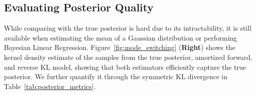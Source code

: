 

% 
% 
\vspace{-3mm}
\subsection{Evaluating Posterior Quality}
\vspace{-1mm}
While comparing with the true posterior is hard due to its intractability, it is still available when estimating the mean of a Gaussian distribution or performing Bayesian Linear Regression. Figure~\ref{fig:mode_switching} (\textbf{Right}) shows the kernel density estimate of the samples from the true posterior, amortized forward, and reverse KL model, showing that both estimators efficiently capture the true posterior. We further quantify it through the symmetric KL divergence in Table~\ref{tab:posterior_metrics}. 

